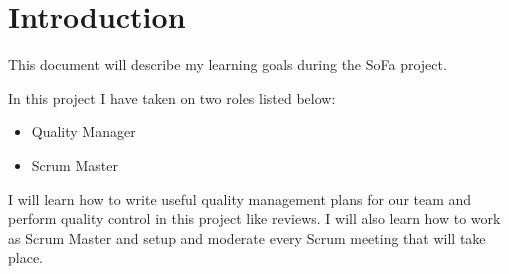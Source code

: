 \section{Introduction}
This document will describe my learning goals during the SoFa project.

In this project I have taken on two roles listed below:
\begin{itemize}
	\item Quality Manager
	\item Scrum Master
\end{itemize}

I will learn how to write useful quality management plans for our team and perform quality control in this project like reviews. I will also learn how to work as Scrum Master and setup and moderate every Scrum meeting that will take place.

